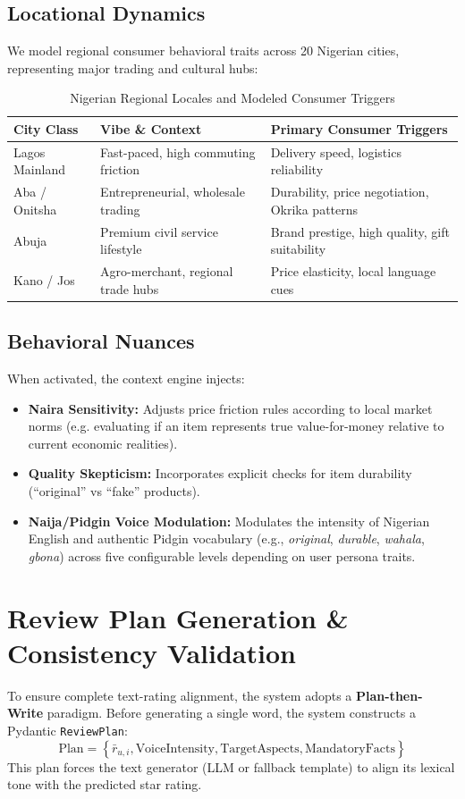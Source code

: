 \documentclass[11pt,a4paper]{article}
\begin{document}
\subsection{Locational Dynamics}
We model regional consumer behavioral traits across 20 Nigerian cities, representing major trading and cultural hubs:
\begin{table}[h!]
\centering
\caption{Nigerian Regional Locales and Modeled Consumer Triggers}
\begin{tabular}{lll}
\toprule
\textbf{City Class} & \textbf{Vibe \& Context} & \textbf{Primary Consumer Triggers} \\
\midrule
Lagos Mainland & Fast-paced, high commuting friction & Delivery speed, logistics reliability \\
Aba / Onitsha & Entrepreneurial, wholesale trading & Durability, price negotiation, Okrika patterns \\
Abuja & Premium civil service lifestyle & Brand prestige, high quality, gift suitability \\
Kano / Jos & Agro-merchant, regional trade hubs & Price elasticity, local language cues \\
\bottomrule
\end{tabular}
\end{table}

\subsection{Behavioral Nuances}
When activated, the context engine injects:
\begin{itemize}
    \item \textbf{Naira Sensitivity:} Adjusts price friction rules according to local market norms (e.g. evaluating if an item represents true value-for-money relative to current economic realities).
    \item \textbf{Quality Skepticism:} Incorporates explicit checks for item durability (``original'' vs ``fake'' products).
    \item \textbf{Naija/Pidgin Voice Modulation:} Modulates the intensity of Nigerian English and authentic Pidgin vocabulary (e.g., \textit{original}, \textit{durable}, \textit{wahala}, \textit{gbona}) across five configurable levels depending on user persona traits.
\end{itemize}

\section{Review Plan Generation \& Consistency Validation}
To ensure complete text-rating alignment, the system adopts a \textbf{Plan-then-Write} paradigm. Before generating a single word, the system constructs a Pydantic \texttt{ReviewPlan}:
\begin{equation}
\text{Plan} = \left\{ \bar{r}_{u,i}, \text{VoiceIntensity}, \text{TargetAspects}, \text{MandatoryFacts} \right\}
\end{equation}
This plan forces the text generator (LLM or fallback template) to align its lexical tone with the predicted star rating. 
\end{document}
